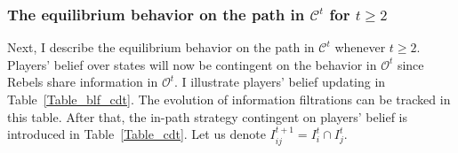 \documentclass[12pt,letter]{article}
\newcommand{\Kappa}{\mathcal{C}}
\newcommand{\Omicron}{\mathcal{O}}
\theoremstyle{definition}
\theoremstyle{remark}
\theoremstyle{claim}
\begin{document}
%


\subsubsection{The equilibrium behavior on the path in $\Kappa^t$ for $t\geq 2$}
Next, I describe the equilibrium behavior on the path in $\Kappa^t$ whenever $t\geq 2$. Players' belief over states will now be contingent on the behavior in $\Omicron^t$ since Rebels share information in $\Omicron^t$. I illustrate players' belief updating in Table~\ref{Table_blf_cdt}. The evolution of information filtrations can be tracked in this table. After that, the in-path strategy contingent on players' belief is introduced in Table~\ref{Table_cdt}. Let us denote $I^{t+1}_{ij}=I^t_i\cap I^t_j$. 
\end{document}
